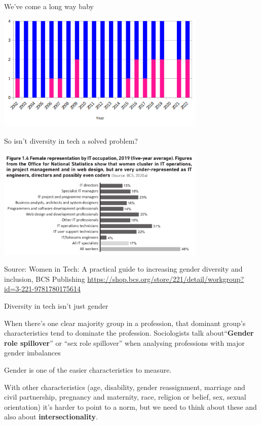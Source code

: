 \documentclass[xcolor=table]{beamer}
\begin{document}
\begin{frame}{We've come a long way baby}

	\includegraphics[width=10cm]{accu_key.png}
\end{frame}
\begin{frame}{So isn't diversity in tech a solved problem?}

	\includegraphics[width=10cm]{it_profession_gender.png}

	\tiny{Source: Women in Tech: A practical guide to increasing gender diversity and inclusion, BCS Publishing \url{https://shop.bcs.org/store/221/detail/workgroup?id=3-221-9781780175614}}
\end{frame}

\begin{frame}{Diversity in tech isn't just gender}

	When there's one clear majority group in a profession, that dominant group's characteristics tend to dominate the profession.  Sociologists talk about``\textbf{Gender role spillover}'' or ``sex role spillover'' when analysing professions with major gender imbalances


	\vspace{0.5em}

	Gender is one of the easier characteristics to measure.  	

	\vspace{0.5em}

	With other characteristics (age, disability, gender reassignment, marriage and civil partnership, pregnancy and maternity, race, religion or belief, sex, sexual orientation) it's harder to point to a norm, but we need to think about these and also about \textbf{intersectionality}.

\end{frame}
\end{document}
